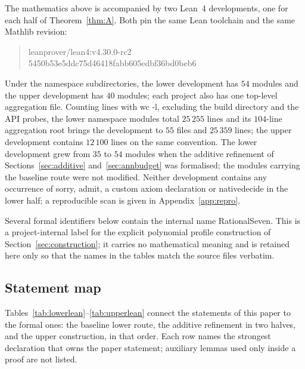 \documentclass[11pt]{article}
\theoremstyle{plain}
\theoremstyle{definition}
\theoremstyle{remark}
\newcommand{\lean}[1]{%
  \begingroup\ttfamily\hyphenchar\font=-1\relax
  \def\_{\textunderscore\allowbreak}%
  #1\endgroup}
\begin{document}
The mathematics above is accompanied by two Lean~4 developments, one for each
half of Theorem~\ref{thm:A}. Both pin the same Lean toolchain and the same
Mathlib revision:
\begin{quote}\small\raggedright
\lean{leanprover/lean4:v4.30.0-rc2}\\
\lean{5450b53e5ddc75d46418fabb605edbf36bd0beb6}
\end{quote}
Under the namespace
subdirectories, the lower development has $54$ modules and the upper development
has $40$ modules; each project also has one top-level aggregation file. Counting
lines with \lean{wc -l}, excluding the build directory and the API probes, the
lower namespace modules total $25\,255$ lines and its $104$-line aggregation
root brings the development to $55$ files and $25\,359$ lines; the upper
development contains $12\,100$ lines on the same convention. The
lower development grew from $35$ to $54$ modules when the additive refinement of
Sections~\ref{sec:additive} and~\ref{sec:annbudget} was formalised; the modules
carrying the baseline route were not modified. Neither development contains any
occurrence of \lean{sorry}, \lean{admit}, a custom \lean{axiom} declaration or
\lean{native\_decide} in the lower half; a reproducible scan is given in
Appendix~\ref{app:repro}.

Several formal identifiers below contain the internal name \lean{RationalSeven}.
This is a project-internal label for the explicit polynomial profile
construction of Section~\ref{sec:construction}; it carries no mathematical
meaning and is retained here only so that the names in the tables match the
source files verbatim.

\subsection{Statement map}

Tables~\ref{tab:lowerlean}--\ref{tab:upperlean} connect the statements of this
paper to the formal ones: the baseline lower route, the additive refinement in
two halves, and the upper construction, in that order. Each row names
the strongest declaration that owns the paper statement; auxiliary lemmas used
only inside a proof are not listed.
\end{document}
